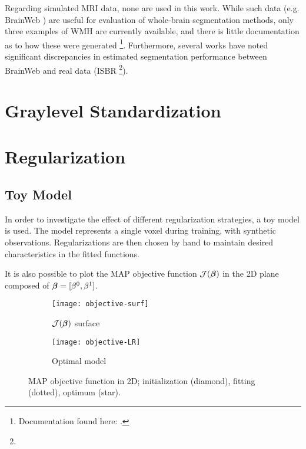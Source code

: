 Regarding simulated MRI data, none are used in this work.
While such data (e.g. BrainWeb \cite{Collins1998}) are useful for evaluation of whole-brain segmentation methods, only three examples of WMH are currently available, and there is little documentation as to how these were generated%
\footnote{Documentation found here: .}.
Furthermore, several works \cite{Klauschen2009,Eggert2012} have noted significant discrepancies in estimated segmentation performance between BrainWeb and real data (ISBR \footnote{}).
\section{Graylevel Standardization}



\section{Regularization}


\subsection{Toy Model}\label{ss:toyreg}
In order to investigate the effect of different regularization strategies, a toy model is used.
The model represents a single voxel during training, with synthetic observations.
Regularizations are then chosen by hand to maintain desired characteristics in the fitted functions.
\par
It is also possible to plot the MAP objective function $\mathcal{J}(\bm{\beta})$ in the 2D plane composed of $\bm{\beta} = [\beta^0,\beta^1]$.
\begin{figure}
  \centering
  \begin{subfigure}{\plotwidth}\centering\texttt{[image: objective-surf]}\caption{$\mathcal{J}(\bm{\beta})$ surface}\label{fig:obj-surf}\end{subfigure}
  \begin{subfigure}{\plotwidth}\centering\texttt{[image: objective-LR]}  \caption{Optimal model}\label{fig:obj-lr}\end{subfigure}
  \caption{MAP objective function in 2D; initialization (diamond), fitting (dotted), optimum (star).}
\end{figure}


